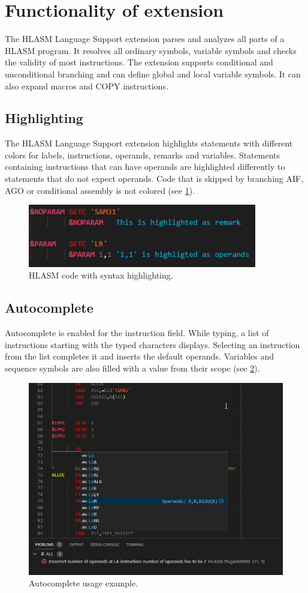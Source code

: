 \section{Functionality of extension}
\label{sec:features}
The HLASM Language Support extension parses and analyzes all parts of a HLASM program. It resolves all ordinary symbols, variable symbols and checks the validity of most instructions. The extension supports conditional and unconditional branching and can define global and local variable symbols. It can also expand macros and COPY instructions.

\subsection{Highlighting}
The HLASM Language Support extension highlights statements with different colors for labels, instructions, operands, remarks and variables. Statements containing instructions that can have operands are highlighted differently to statements that do not expect operands. Code that is skipped by branching AIF, AGO or conditional assembly is not colored (see \cref{fig:high}).

\begin{figure}
	\centering
	\includegraphics[width=10cm]{img/highligting}
	\caption{HLASM code with syntax highlighting.}
	\label{fig:high}
\end{figure}

\subsection{Autocomplete}
Autocomplete is enabled for the instruction field. While typing, a list of instructions starting with the typed characters displays. Selecting an instruction from the list completes it and inserts the default operands. Variables and sequence symbols are also filled with a value from their scope (see \cref{fig:auto}).

\begin{figure}
	\centering
	\includegraphics[width=0.75\linewidth]{img/autocomplete/autocomplete-32}
	\caption{Autocomplete usage example.}
	\label{fig:auto}
\end{figure}

